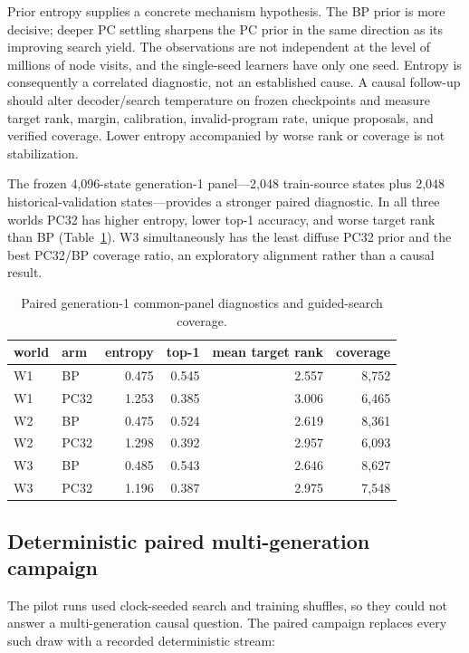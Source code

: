 \documentclass[11pt]{article}
\begin{document}
Prior entropy supplies a concrete mechanism hypothesis.  The BP prior is more decisive;
deeper PC settling sharpens the PC prior in the same direction as its improving search
yield.  The observations are not independent at the level of millions of node visits, and
the single-seed learners have only one seed.  Entropy is consequently a correlated diagnostic,
not an established cause.  A causal follow-up should alter decoder/search temperature on
frozen checkpoints and measure target rank, margin, calibration, invalid-program rate,
unique proposals, and verified coverage.  Lower entropy accompanied by worse rank or
coverage is not stabilization.

The frozen 4,096-state generation-1 panel---2,048 train-source states plus 2,048
historical-validation states---provides a stronger paired diagnostic.  In all three worlds
PC32 has higher entropy, lower top-1 accuracy, and worse target rank than BP
(Table~\ref{tab:paired-policy}).  W3 simultaneously has the least diffuse PC32 prior and
the best PC32/BP coverage ratio, an exploratory alignment rather than a causal result.

\begin{table}[ht]
\centering
\caption{Paired generation-1 common-panel diagnostics and guided-search coverage.}
\label{tab:paired-policy}
\begin{tabular}{@{}llrrrr@{}}
\toprule
world & arm & entropy & top-1 & mean target rank & coverage \\
\midrule
W1 & BP   & 0.475 & 0.545 & 2.557 & 8,752 \\
W1 & PC32 & 1.253 & 0.385 & 3.006 & 6,465 \\
W2 & BP   & 0.475 & 0.524 & 2.619 & 8,361 \\
W2 & PC32 & 1.298 & 0.392 & 2.957 & 6,093 \\
W3 & BP   & 0.485 & 0.543 & 2.646 & 8,627 \\
W3 & PC32 & 1.196 & 0.387 & 2.975 & 7,548 \\
\bottomrule
\end{tabular}
\end{table}

\subsection{Deterministic paired multi-generation campaign}
\label{sec:tree-protocol}

The pilot runs used clock-seeded search and training shuffles, so they could not answer a
multi-generation causal question.  The paired campaign replaces every such draw with a
recorded deterministic stream:
\end{document}
